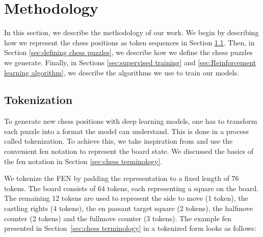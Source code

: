 \section{Methodology}
\label{sec:methodology}

In this section, we describe the methodology of our work. We begin by describing how we represent the chess positions as token sequences in Section \ref{sec:tokenization}. Then, in Section \ref{sec:defining chess puzzles}, we describe how we define the chess puzzles we generate. Finally, in Sections \ref{sec:supervised training} and \ref{sec:Reinforcement learning algorithm}, we describe the algorithms we use to train our models.

\subsection{Tokenization}
\label{sec:tokenization}

To generate new chess positions with deep learning models, one has to transform each puzzle into a format the model can understand. This is done in a process called tokenization. To achieve this, we take inspiration from \cite{ruoss2024amortizedplanninglargescaletransformers, feng2025generatingcreativechesspuzzles} and use the convenient fen notation to represent the board state. We discussed the basics of the fen notation in Section \ref{sec:chess terminology}.




We tokenize the FEN by padding the representation to a fixed length of 76 tokens. The board consists of 64 tokens, each representing a square on the board. The remaining 12 tokens are used to represent the side to move (1 token), the castling rights (4 tokens), the en passant target square (2 tokens), the halfmove counter (2 tokens) and the fullmove counter (3 tokens). The example fen presented in Section~\ref{sec:chess terminology} in a tokenized form looks as follows:

